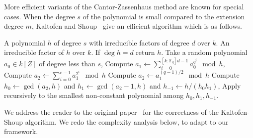 \documentclass[12pt]{article}
\theoremstyle{plain}
\theoremstyle{definition}
\def\F{\ensuremath{\mathbb{F}}}
\newcounter{algorithm}
\begin{document}
More efficient variants of the Cantor-Zassenhaus method are known for
special cases. When the degree $s$ of the polynomial is small compared
to the extension degree $m$, Kaltofen and Shoup~\cite{kaltofen+shoup97} 
give an efficient algorithm which is as follows.

\begin{algorithm}
	\label{alg:ks}
	\begin{algorithmic}[1]
		\REQUIRE A polynomial $h$ of degree $s$ with irreducible factors of degree $d$ over $k$.
		\ENSURE An irreducible factor of $h$ over $k$.
		\STATE If $\deg h = d$ return $h$.
		\STATE Take a random polynomial $a_0\in k[Z]$ of degree less than $s$,
		\STATE\label{alg:ks-pseudotrace} Compute $\displaystyle a_1 
		\leftarrow \sum_{i=0}^{[k:\F_q]d-1} a_0^{q^i} \mod h$,
		\STATE\label{alg:ks:even} Compute $\displaystyle a_2 \leftarrow 
		\sum_{i=0}^{e-1} a_1^{2^i}\mod h$
		\ELSE
		\STATE\label{alg:ks:odd} Compute $a_2 \leftarrow a_1^{(q-1)/2}\mod h$
		\ENDIF
		\STATE\label{alg:ks:gcd} Compute $h_0\leftarrow\gcd(a_2,h)$ and 
		$h_1\leftarrow\gcd(a_2-1,h)$ and $h_{-1}\leftarrow h/(h_0h_1)$,
		\STATE Apply recursively to the smallest non-constant polynomial among 
		$h_0,h_1,h_{-1}$.
	\end{algorithmic}
\end{algorithm}

We address the reader to the original paper~\cite{kaltofen+shoup97}
for the correctness of the Kaltofen-Shoup algorithm. We redo the
complexity analysis below, to adapt to our framework.
\end{document}
